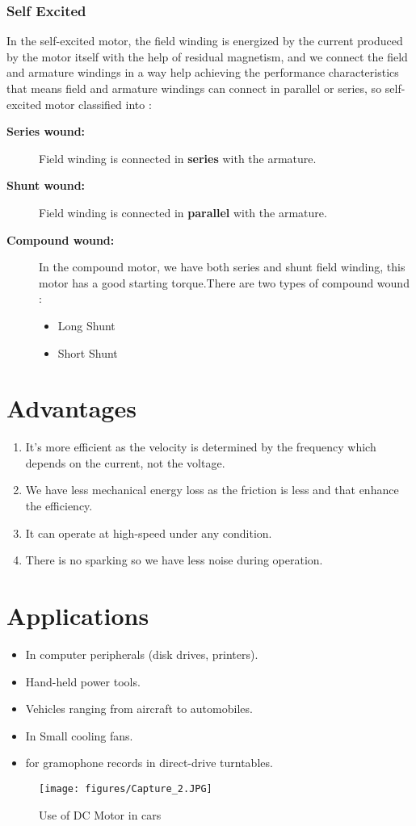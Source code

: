 \documentclass{article}
\begin{document}
    \subsubsection{Self Excited}
    In the self-excited motor, the field
winding is energized by the current produced by the
motor itself with the help of residual magnetism, and we connect the field
and armature
windings in a way help achieving the performance characteristics that means field
and armature windings can connect in parallel or series, so self-excited motor classified into :
    \begin{description}
    
        \item [\textbf{Series wound:}] Field winding is connected in \textbf{series} with the armature.
        \item [\textbf{Shunt wound:}]Field winding is connected in \textbf{parallel} with the armature.
        \newpage
            \item [\textbf{Compound wound:}] In the compound motor, we have both series and shunt field
winding, this motor has a
good starting torque.There are two types of compound wound : 
        \begin{itemize}
            \item Long Shunt
            \item Short Shunt
        \end{itemize}
    \end{description}
\section{Advantages}
\begin{enumerate}
    \item It’s more efficient
as the velocity is determined by the frequency which depends
on the current, not the voltage.
\item We have less mechanical energy loss as the friction is less and that enhance the
efficiency.
\item It can operate at high-speed under any condition.
\item There is no sparking so we have less noise during operation.
\end{enumerate}
 \section{Applications}
 \begin{itemize}
     \item In computer peripherals (disk drives, printers).
\item Hand-held power tools.
\item Vehicles ranging from aircraft to automobiles.
\item In Small cooling fans.
\item for gramophone records in direct-drive turntables.

 \end{itemize}
 \begin{figure}[h]
  \centering
   \texttt{[image: figures/Capture\_2.JPG]}
    \caption{Use of DC Motor in cars}
    \label{fig:my_label}
\end{figure}
\end{document}
